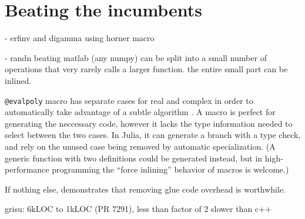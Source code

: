 \section{Beating the incumbents}

- erfinv and digamma using horner macro

- randn beating matlab (any numpy)
  can be split into a small number of operations that very rarely calls
  a larger function.
  the entire small part can be inlined.

\texttt{@evalpoly} macro has separate cases for real and complex in order to
automatically take advantage of a subtle algorithm \cite{knuth1969art}.
A macro is perfect for generating the neccessary code, however it lacks
the type information needed to select between the two cases.
In Julia, it can generate a branch with a type check, and rely on the
unused case being removed by automatic specialization. (A generic
function with two definitions could be generated instead, but in
high-performance programming the ``force inlining'' behavior of macros
is welcome.)

If nothing else, demonstrates that removing glue code overhead is worthwhile.

grisu: 6kLOC to 1kLOC (PR 7291), less than factor of 2 slower than c++




